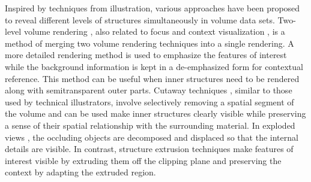Inspired by techniques from illustration, various approaches have been proposed to reveal different levels of structures simultaneously in volume data sets.
Two-level volume rendering \cite{hauser_two-level_2001} \cite{hadwiger_high-quality_2003} \cite{corcoran_perceptual_2010}, also related to focus and context visualization \cite{wang_magic_2005} \cite{bruckner_illustrative_2006} \cite{chen_intelligent_2008}, is a method of merging two volume rendering techniques into a single rendering. A more detailed rendering method is used to emphasize the features of interest while the background information is kept in a de-emphasized form for contextual reference. This method can be useful when inner structures need to be rendered along with semitransparent outer parts.
Cutaway techniques \cite{burns_feature_2007} \cite{sigg_intelligent_2012}, similar to those used by technical illustrators, involve selectively removing a spatial segment of the volume and can be used make inner structures clearly visible while preserving a sense of their spatial relationship with the surrounding material.
In exploded views \cite{bruckner_exploded_2006}, the occluding objects are decomposed and displaced so that the internal details are visible.
In contrast, structure extrusion techniques \cite{diaz_adaptive_2012} make features of interest visible by extruding them off the clipping plane and preserving the context by adapting the extruded region.




